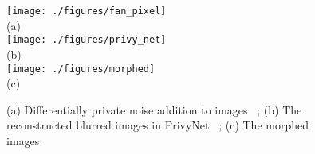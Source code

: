 \documentclass[conference]{IEEEtran}
\begin{document}
\begin{figure}[h]
  \centering
    \texttt{[image: ./figures/fan\_pixel]}\\
    \small (a)\\
    \texttt{[image: ./figures/privy\_net]}\\
    \small (b)\\
    \texttt{[image: ./figures/morphed]}\\
    \small (c)\\
  \caption{(a) Differentially private noise addition to images ~\cite{fan18}; (b) The reconstructed blurred images in PrivyNet ~\cite{li17}; (c) The morphed images ~\cite{lee96_morph}} 
  \label{fig:existing_app}
\end{figure}
\end{document}
